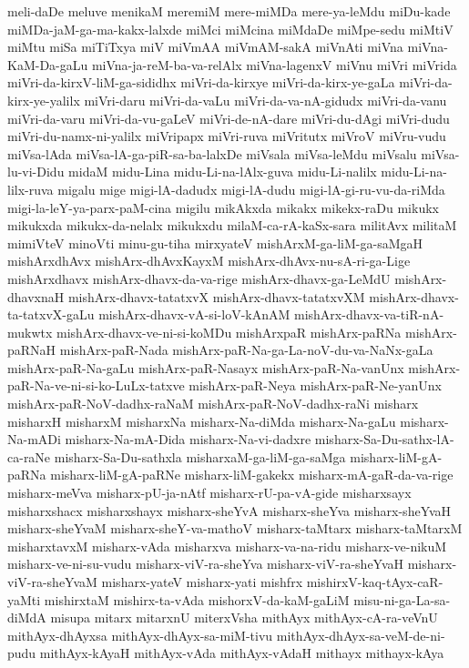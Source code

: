 {meli-daDe
meluve
menikaM
meremiM
mere-miMDa
mere-ya-leMdu
miDu-kade
miMDa-jaM-ga-ma-kakx-lalxde
miMci
miMcina
miMdaDe
miMpe-sedu
miMtiV
miMtu
miSa
miTiTxya
miV
miVmAA
miVmAM-sakA
miVnAti
miVna
miVna-KaM-Da-gaLu
miVna-ja-reM-ba-va-relAlx
miVna-lagenxV
miVnu
miVri
miVrida
miVri-da-kirxV-liM-ga-sididhx
miVri-da-kirxye
miVri-da-kirx-ye-gaLa
miVri-da-kirx-ye-yalilx
miVri-daru
miVri-da-vaLu
miVri-da-va-nA-gidudx
miVri-da-vanu
miVri-da-varu
miVri-da-vu-gaLeV
miVri-de-nA-dare
miVri-du-dAgi
miVri-dudu
miVri-du-namx-ni-yalilx
miVripapx
miVri-ruva
miVritutx
miVroV
miVru-vudu
miVsa-lAda
miVsa-lA-ga-piR-sa-ba-lalxDe
miVsala
miVsa-leMdu
miVsalu
miVsa-lu-vi-Didu
midaM
midu-Lina
midu-Li-na-lAlx-guva
midu-Li-nalilx
midu-Li-na-lilx-ruva
migalu
mige
migi-lA-dadudx
migi-lA-dudu
migi-lA-gi-ru-vu-da-riMda
migi-la-leY-ya-parx-paM-cina
migilu
mikAkxda
mikakx
mikekx-raDu
mikukx
mikukxda
mikukx-da-nelalx
mikukxdu
milaM-ca-rA-kaSx-sara
militAvx
militaM
mimiVteV
minoVti
minu-gu-tiha
mirxyateV
mishArxM-ga-liM-ga-saMgaH
mishArxdhAvx
mishArx-dhAvxKayxM
mishArx-dhAvx-nu-sA-ri-ga-Lige
mishArxdhavx
mishArx-dhavx-da-va-rige
mishArx-dhavx-ga-LeMdU
mishArx-dhavxnaH
mishArx-dhavx-tatatxvX
mishArx-dhavx-tatatxvXM
mishArx-dhavx-ta-tatxvX-gaLu
mishArx-dhavx-vA-si-loV-kAnAM
mishArx-dhavx-va-tiR-nA-mukwtx
mishArx-dhavx-ve-ni-si-koMDu
mishArxpaR
mishArx-paRNa
mishArx-paRNaH
mishArx-paR-Nada
mishArx-paR-Na-ga-La-noV-du-va-NaNx-gaLa
mishArx-paR-Na-gaLu
mishArx-paR-Nasayx
mishArx-paR-Na-vanUnx
mishArx-paR-Na-ve-ni-si-ko-LuLx-tatxve
mishArx-paR-Neya
mishArx-paR-Ne-yanUnx
mishArx-paR-NoV-dadhx-raNaM
mishArx-paR-NoV-dadhx-raNi
misharx
misharxH
misharxM
misharxNa
misharx-Na-diMda
misharx-Na-gaLu
misharx-Na-mADi
misharx-Na-mA-Dida
misharx-Na-vi-dadxre
misharx-Sa-Du-sathx-lA-ca-raNe
misharx-Sa-Du-sathxla
misharxaM-ga-liM-ga-saMga
misharx-liM-gA-paRNa
misharx-liM-gA-paRNe
misharx-liM-gakekx
misharx-mA-gaR-da-va-rige
misharx-meVva
misharx-pU-ja-nAtf
misharx-rU-pa-vA-gide
misharxsayx
misharxshacx
misharxshayx
misharx-sheYvA
misharx-sheYva
misharx-sheYvaH
misharx-sheYvaM
misharx-sheY-va-mathoV
misharx-taMtarx
misharx-taMtarxM
misharxtavxM
misharx-vAda
misharxva
misharx-va-na-ridu
misharx-ve-nikuM
misharx-ve-ni-su-vudu
misharx-viV-ra-sheYva
misharx-viV-ra-sheYvaH
misharx-viV-ra-sheYvaM
misharx-yateV
misharx-yati
mishfrx
mishirxV-kaq-tAyx-caR-yaMti
mishirxtaM
mishirx-ta-vAda
mishorxV-da-kaM-gaLiM
misu-ni-ga-La-sa-diMdA
misupa
mitarx
mitarxnU
miterxVsha
mithAyx
mithAyx-cA-ra-veVnU
mithAyx-dhAyxsa
mithAyx-dhAyx-sa-miM-tivu
mithAyx-dhAyx-sa-veM-de-ni-pudu
mithAyx-kAyaH
mithAyx-vAda
mithAyx-vAdaH
mithayx
mithayx-kAya
}
